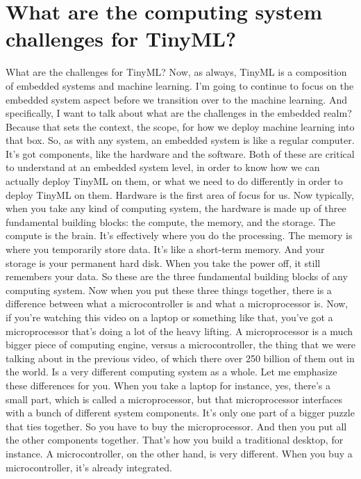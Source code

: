 \section{What are the computing system challenges for TinyML?}

What are the challenges for TinyML?
Now, as always, TinyML is a composition of embedded systems and machine learning.
I'm going to continue to focus on the embedded system aspect before we transition over to the machine learning.
And specifically, I want to talk about what are the challenges in the embedded realm?
Because that sets the context, the scope, for how we deploy machine learning into that box.
So, as with any system, an embedded system is like a regular computer.
It's got components, like the hardware and the software.
Both of these are critical to understand at an embedded system level, in order to know how we can actually deploy TinyML on them, or what we need to do differently in order to deploy TinyML on them.
Hardware is the first area of focus for us.
Now typically, when you take any kind of computing system, the hardware is made up of three fundamental building blocks: the compute, the memory, and the storage.
The compute is the brain.
It's effectively where you do the processing.
The memory is where you temporarily store data.
It's like a short-term memory.
And your storage is your permanent hard disk.
When you take the power off, it still remembers your data.
So these are the three fundamental building blocks of any computing system.
Now when you put these three things together, there is a difference between what a microcontroller is and what a microprocessor is.
Now, if you're watching this video on a laptop or something like that, you've got a microprocessor that's doing a lot of the heavy lifting.
A microprocessor is a much bigger piece of computing engine, versus a microcontroller, the thing that we were talking about in the previous video, of which there over 250 billion of them out in the world.
Is a very different computing system as a whole.
Let me emphasize these differences for you.
When you take a laptop for instance, yes, there's a small part, which is called a microprocessor, but that microprocessor interfaces with a bunch of different system components.
It's only one part of a bigger puzzle that ties together.
So you have to buy the microprocessor.
And then you put all the other components together.
That's how you build a traditional desktop, for instance.
A microcontroller, on the other hand, is very different.
When you buy a microcontroller, it's already integrated.
